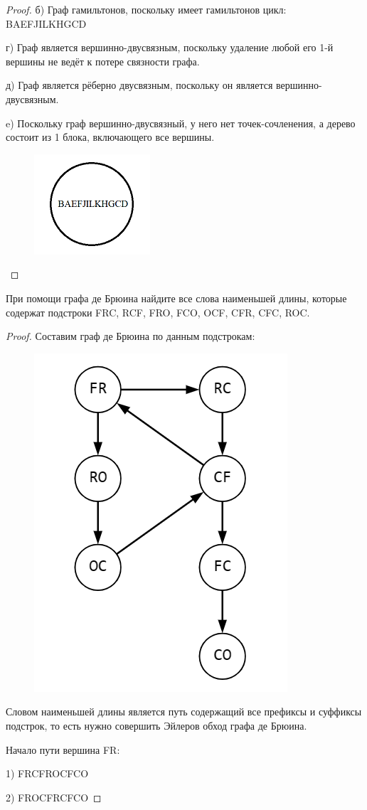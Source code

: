 \begin{proof}
	б) Граф гамильтонов, поскольку имеет гамильтонов цикл: BAEFJILKHGCD
    
    г) Граф является вершинно-двусвязным, поскольку удаление любой его 1-й вершины не ведёт к потере связности графа.

    д) Граф является рёберно двусвязным, поскольку он является вершинно-двусвязным.

    e) Поскольку граф вершинно-двусвязный, у него нет точек-сочленения, а дерево состоит из 1 блока, включающего все вершины.

    \begin{figure}[h]
    \centering
     \includegraphics[width=0.2\linewidth]{pics/5thEsolution.png}
     \label{fig:dm}
    \end{figure}
    
\end{proof}

\begin{problem}[6]
	При помощи графа де Брюина найдите все слова наименьшей длины, которые содержат подстроки FRC, RCF, FRO, FCO, OCF, CFR, CFC, ROC.
\end{problem}

\begin{proof}
    Составим граф де Брюина по данным подстрокам:

    \begin{figure}[h]
    \centering
     \includegraphics[width=0.35\linewidth]{pics/6thGraph.png}
     \label{fig:dm}
    \end{figure}

    Словом наименьшей длины является путь содержащий все префиксы и суффиксы подстрок, то есть нужно совершить Эйлеров обход графа де Брюина.
    
    Начало пути вершина FR:
    
    1) FRCFROCFCO
    
    2) FROCFRCFCO 
    
\end{proof}

